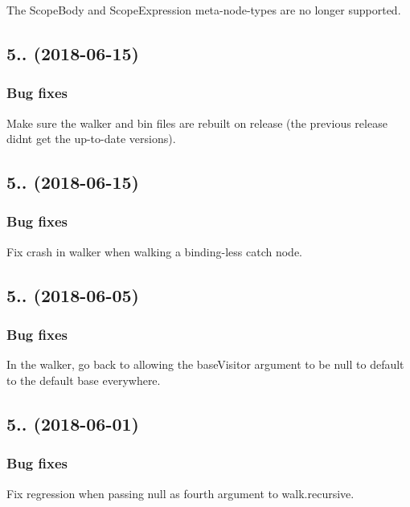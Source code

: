 The {\ttfamily Scope\+Body} and {\ttfamily Scope\+Expression} meta-\/node-\/types are no longer supported.

\subsection*{5.. (2018-\/06-\/15)}

\subsubsection*{Bug fixes}

Make sure the walker and bin files are rebuilt on release (the previous release didn\textquotesingle{}t get the up-\/to-\/date versions).

\subsection*{5.. (2018-\/06-\/15)}

\subsubsection*{Bug fixes}

Fix crash in walker when walking a binding-\/less catch node.

\subsection*{5.. (2018-\/06-\/05)}

\subsubsection*{Bug fixes}

In the walker, go back to allowing the {\ttfamily base\+Visitor} argument to be null to default to the default base everywhere.

\subsection*{5.. (2018-\/06-\/01)}

\subsubsection*{Bug fixes}

Fix regression when passing {\ttfamily null} as fourth argument to {\ttfamily walk.\+recursive}.

